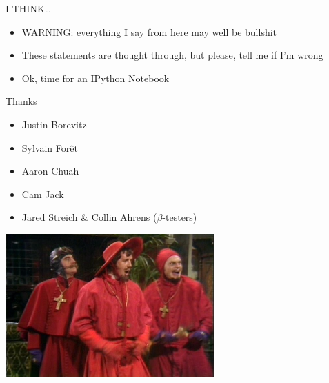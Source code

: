 \documentclass[t]{beamer}
\begin{document}
\begin{frame}{I THINK\ldots}
  \begin{itemize}
    \item WARNING: everything I say from here may well be bullshit
    \item These statements are thought through, but please, tell me if I'm
      wrong
    \pause
    \item Ok, time for an IPython Notebook
  \end{itemize}
\end{frame}



\begin{frame}{Thanks}
  \begin{itemize}
    \item Justin Borevitz
    \item Sylvain For\^{e}t
    \item Aaron Chuah
    \item Cam Jack
    \item Jared Streich \& Collin Ahrens ($\beta$-testers)
  \end{itemize}
  \begin{center}
    \includegraphics[width=0.6\textwidth]{img/spaninq.jpg}
  \end{center}
\end{frame}
\end{document}
